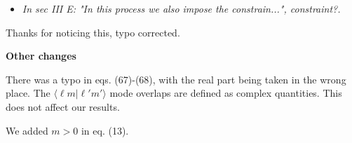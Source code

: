 \documentclass[11pt]{letter}
\begin{document}
\begin{itemize}
	\item {\it In sec III E: "In this process we also impose the
constrain...", constraint?.}
\end{itemize}

Thanks for noticing this, typo corrected.

\textbf{Other changes}

There was a typo in eqs. (67)-(68), with the real part being taken in the wrong place. The $\langle \ell m | \ell' m'\rangle$ mode overlaps are defined as complex quantities. This does not affect our results.

We added $m>0$ in eq. (13).
\end{document}
